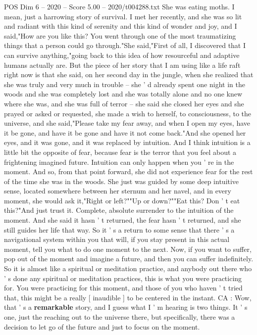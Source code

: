 \begin{textsample}{POS Dim 6 – 2020 – Score 5.00 – 2020/t004288.txt}
She was eating moths.
I mean, just a harrowing story of survival.
I met her recently, and she was so lit and radiant with this kind of serenity and this kind of wonder and joy, and I said,"How are you like this?
You went through one of the most traumatizing things that a person could go through."She said,"First of all, I discovered that I can survive anything,"going back to this idea of how resourceful and adaptive humans actually are.
But the piece of her story that I am using like a life raft right now is that she said, on her second day in the jungle, when she realized that she was truly and very much in trouble -- she ' d already spent one night in the woods and she was completely lost and she was totally alone and no one knew where she was, and she was full of terror -- she said she closed her eyes and she prayed or asked or requested, she made a wish to herself, to consciousness, to the universe, and she said,"Please take my fear away, and when I open my eyes, have it be gone, and have it be gone and have it not come back."And she opened her eyes, and it was gone, and it was replaced by intuition.
And I think intuition is a little bit the opposite of fear, because fear is the terror that you feel about a frightening imagined future.
Intuition can only happen when you ' re in the moment.
And so, from that point forward, she did not experience fear for the rest of the time she was in the woods.
She just was guided by some deep intuitive sense, located somewhere between her sternum and her navel, and in every moment, she would ask it,"Right or left?""Up or down?""Eat this?
Don ' t eat this?"And just trust it.
Complete, absolute surrender to the intuition of the moment.
And she said it hasn ' t returned, the fear hasn ' t returned, and she still guides her life that way.
So it ' s a return to some sense that there ' s a navigational system within you that will, if you stay present in this actual moment, tell you what to do one moment to the next.
Now, if you want to suffer, pop out of the moment and imagine a future, and then you can suffer indefinitely.
So it is almost like a spiritual or meditation practice, and anybody out there who ' s done any spiritual or meditation practices, this is what you were practicing for.
You were practicing for this moment, and those of you who haven ' t tried that, this might be a really [ inaudible ] to be centered in the instant.
CA : Wow, that ' s a \textbf{remarkable} story, and I guess what I ' m hearing is two things.
It ' s one, just the reaching out to the universe there, but specifically, there was a decision to let go of the future and just to focus on the moment.

\end{textsample}
